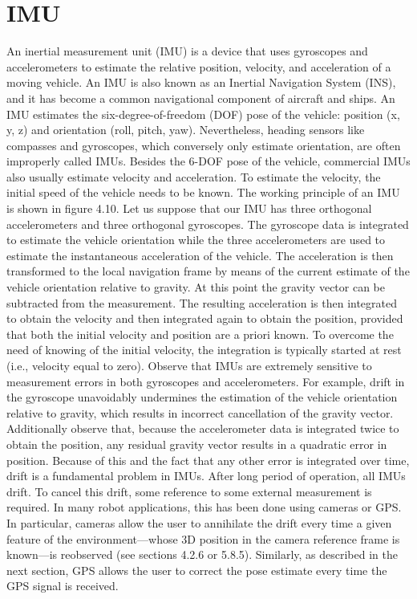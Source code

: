 \section{IMU}
An inertial measurement unit (IMU) is a device that uses gyroscopes and accelerometers to estimate the relative position, velocity, and acceleration of a moving vehicle. An IMU is also known as an Inertial Navigation System (INS), and it has become a common navigational component of aircraft and ships. 
An IMU estimates the six-degree-of-freedom (DOF) pose of the vehicle: position (x, y, z) and orientation (roll, pitch, yaw). Nevertheless, heading sensors like compasses and gyroscopes, which conversely only estimate orientation, are often improperly called IMUs.
Besides the 6-DOF pose of the vehicle, commercial IMUs also usually estimate velocity and acceleration. To estimate the velocity, the initial speed of the vehicle needs to be known. The working principle of an IMU is shown in figure 4.10. Let us suppose that our IMU has three orthogonal accelerometers and three orthogonal gyroscopes. The gyroscope data is integrated to estimate the vehicle orientation while the three accelerometers are used to estimate the instantaneous acceleration of the vehicle. The acceleration is then transformed to the local navigation frame by means of the current estimate of the vehicle orientation relative to gravity. At this point the gravity vector can be subtracted from the measurement. The resulting acceleration is then integrated to  obtain the velocity and then integrated again to obtain the position, provided that both the initial velocity and position are a priori known. To overcome the need of knowing of the initial velocity, the integration is typically started at rest (i.e., velocity equal to zero).
Observe that IMUs are extremely sensitive to measurement errors in both gyroscopes and accelerometers. For example, drift in the gyroscope unavoidably undermines the estimation of the vehicle orientation relative to gravity, which results in incorrect cancellation of the gravity vector. Additionally observe that, because the accelerometer data is integrated twice to obtain the position, any residual gravity vector results in a quadratic error in position. Because of this and the fact that any other error is integrated over time, drift is a fundamental problem in IMUs. After long period of operation, all IMUs drift. To cancel this drift, some reference to some external measurement is required. In many robot applications, this has been done using cameras or GPS. In particular, cameras allow the user to annihilate the drift every time a given feature of the environment—whose 3D position in the camera reference frame is known—is reobserved (see sections 4.2.6 or 5.8.5). Similarly, as described in the next section, GPS allows the user to correct the pose estimate every time the GPS signal is received.

